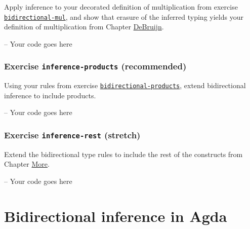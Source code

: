 Apply inference to your decorated definition of multiplication from
exercise
\protect\hyperlink{Inference-bidirectional-mul}{\texttt{bidirectional-mul}},
and show that erasure of the inferred typing yields your definition of
multiplication from Chapter \protect\hyperlink{DeBruijn}{DeBruijn}.

\begin{fence}
\begin{code}
-- Your code goes here
\end{code}
\end{fence}

\hypertarget{exercise-inference-products-recommended}{%
\subsubsection{\texorpdfstring{Exercise \texttt{inference-products}
(recommended)}{Exercise inference-products (recommended)}}\label{exercise-inference-products-recommended}}

Using your rules from exercise
\protect\hyperlink{Inference-bidirectional-products}{\texttt{bidirectional-products}},
extend bidirectional inference to include products.

\begin{fence}
\begin{code}
-- Your code goes here
\end{code}
\end{fence}

\hypertarget{exercise-inference-rest-stretch}{%
\subsubsection{\texorpdfstring{Exercise \texttt{inference-rest}
(stretch)}{Exercise inference-rest (stretch)}}\label{exercise-inference-rest-stretch}}

Extend the bidirectional type rules to include the rest of the
constructs from Chapter \protect\hyperlink{More}{More}.

\begin{fence}
\begin{code}
-- Your code goes here
\end{code}
\end{fence}

\hypertarget{bidirectional-inference-in-agda}{%
\section{Bidirectional inference in
Agda}\label{bidirectional-inference-in-agda}}

